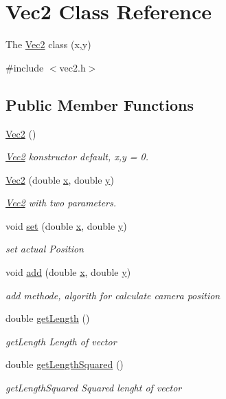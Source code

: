 \hypertarget{classVec2}{}\section{Vec2 Class Reference}
\label{classVec2}


The \hyperlink{classVec2}{Vec2} class (x,y)  




{\ttfamily \#include $<$vec2.\+h$>$}

\subsection*{Public Member Functions}
\begin{DoxyCompactItemize}
\item 
\mbox{\label{classVec2_a76080feed7005893ecc634f903cfbae0}} 
\hyperlink{classVec2_a76080feed7005893ecc634f903cfbae0}{Vec2} ()
\begin{DoxyCompactList}\small\item\em \hyperlink{classVec2}{Vec2} konstructor default, x,y = 0. \end{DoxyCompactList}\item 
\hyperlink{classVec2_a01363a5456ac9b4a9b92cb6b7d7eb82a}{Vec2} (double \hyperlink{classVec2_a0ee7118259bcfc2fe997d4bf816ed682}{x}, double \hyperlink{classVec2_a9c6f37b5242919bccff799c8f05dee55}{y})
\begin{DoxyCompactList}\small\item\em \hyperlink{classVec2}{Vec2} with two parameters. \end{DoxyCompactList}\item 
void \hyperlink{classVec2_a3574fcb9ccc0abd7e7e82abe22dabb83}{set} (double \hyperlink{classVec2_a0ee7118259bcfc2fe997d4bf816ed682}{x}, double \hyperlink{classVec2_a9c6f37b5242919bccff799c8f05dee55}{y})
\begin{DoxyCompactList}\small\item\em set actual Position \end{DoxyCompactList}\item 
void \hyperlink{classVec2_a591966ea1b13cf9333e57999e4953465}{add} (double \hyperlink{classVec2_a0ee7118259bcfc2fe997d4bf816ed682}{x}, double \hyperlink{classVec2_a9c6f37b5242919bccff799c8f05dee55}{y})
\begin{DoxyCompactList}\small\item\em add methode, algorith for calculate camera position \end{DoxyCompactList}\item 
double \hyperlink{classVec2_a0cf7a6aad8f6b48805455f31a69feb5d}{get\+Length} ()
\begin{DoxyCompactList}\small\item\em get\+Length Length of vector \end{DoxyCompactList}\item 
double \hyperlink{classVec2_a229954458b6789250afb7f6af143002c}{get\+Length\+Squared} ()
\begin{DoxyCompactList}\small\item\em get\+Length\+Squared Squared lenght of vector \end{DoxyCompactList}\end{DoxyCompactItemize}
